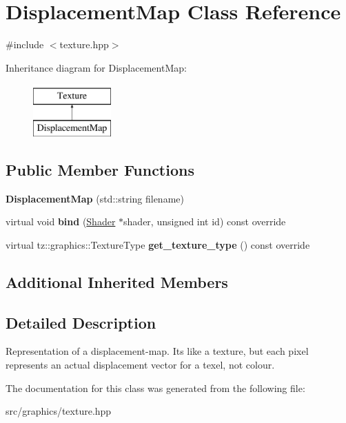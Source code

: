 \hypertarget{class_displacement_map}{}\section{Displacement\+Map Class Reference}
\label{class_displacement_map}


{\ttfamily \#include $<$texture.\+hpp$>$}

Inheritance diagram for Displacement\+Map\+:\begin{figure}[H]
\begin{center}
\leavevmode
\includegraphics[height=2.000000cm]{class_displacement_map}
\end{center}
\end{figure}
\subsection*{Public Member Functions}
\begin{DoxyCompactItemize}
\item 
\mbox{\label{class_displacement_map_ad9fb0c5ac51d5dede9d6cbd0721add36}} 
{\bfseries Displacement\+Map} (std\+::string filename)
\item 
\mbox{\label{class_displacement_map_afbc019ec3ec956d0eac44442d4346274}} 
virtual void {\bfseries bind} (\mbox{\hyperlink{class_shader}{Shader}} $\ast$shader, unsigned int id) const override
\item 
\mbox{\label{class_displacement_map_a86b4259eb46e198c6d535461c0665019}} 
virtual tz\+::graphics\+::\+Texture\+Type {\bfseries get\+\_\+texture\+\_\+type} () const override
\end{DoxyCompactItemize}
\subsection*{Additional Inherited Members}


\subsection{Detailed Description}
Representation of a displacement-\/map. It\textquotesingle{}s like a texture, but each pixel represents an actual displacement vector for a texel, not colour. 

The documentation for this class was generated from the following file\+:\begin{DoxyCompactItemize}
\item 
src/graphics/texture.\+hpp\end{DoxyCompactItemize}
